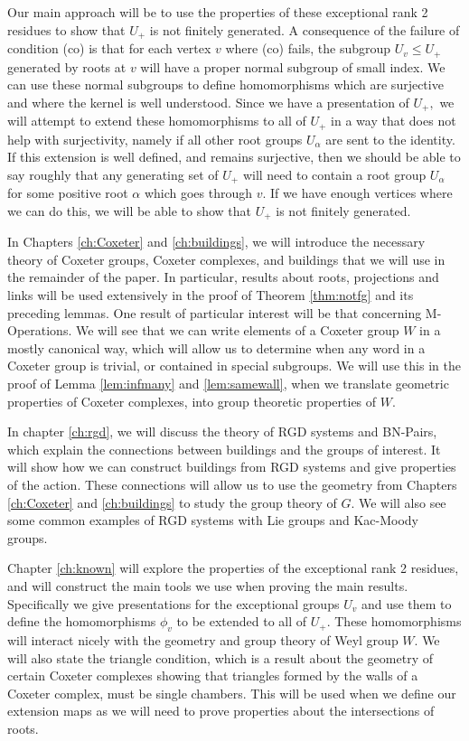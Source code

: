 \documentclass[class=book, crop=false,12 pt]{standalone}
\begin{document}
Our main approach will be to use the properties of these exceptional rank 2 residues to show that $U_+$ is not finitely generated. A consequence of the failure of condition (co) is that for each vertex $v$ where (co) fails, the subgroup $U_v\le U_+$ generated by roots at $v$ will have a proper normal subgroup of small index. We can use these normal subgroups to define homomorphisms which are surjective and where the kernel is well understood. Since we have a presentation of $U_+,$ we will attempt to extend these homomorphisms to all of $U_+$ in a way that does not help with surjectivity, namely if all other root groups $U_\alpha$ are sent to the identity. If this extension is well defined, and remains surjective, then we should be able to say roughly that any generating set of $U_+$ will need to contain a root group $U_\alpha$ for some positive root $\alpha$ which goes through $v.$ If we have enough vertices where we can do this, we will be able to show that $U_+$ is not finitely generated.

In Chapters \ref{ch:Coxeter} and \ref{ch:buildings}, we will introduce the necessary theory of Coxeter groups, Coxeter complexes, and buildings that we will use in the remainder of the paper. In particular, results about roots, projections and links will be used extensively in the proof of Theorem \ref{thm:notfg} and its preceding lemmas. One result of particular interest will be that concerning M-Operations. We will see that we can write elements of a Coxeter group $W$ in a mostly canonical way, which will allow us to determine when any word in a Coxeter group is trivial, or contained in special subgroups. We will use this in the proof of Lemma \ref{lem:infmany} and \ref{lem:samewall}, when we translate geometric properties of Coxeter complexes, into group theoretic properties of $W.$

In chapter \ref{ch:rgd}, we will discuss the theory of RGD systems and BN-Pairs, which explain the connections between buildings and the groups of interest. It will show how we can construct buildings from RGD systems and give properties of the action. These connections will allow us to use the geometry from Chapters \ref{ch:Coxeter} and \ref{ch:buildings} to study the group theory of $G.$ We will also see some common examples of RGD systems with Lie groups and Kac-Moody groups.

Chapter \ref{ch:known} will explore the properties of the exceptional rank 2 residues, and will construct the main tools we use when proving the main results. Specifically we give presentations for the exceptional groups $U_v$ and use them to define the homomorphisms $\phi_v$ to be extended to all of $U_+.$ These homomorphisms will interact nicely with the geometry and group theory of Weyl group $W.$ We will also state the triangle condition, which is a result about the geometry of certain Coxeter complexes showing that triangles formed by the walls of a Coxeter complex, must be single chambers. This will be used when we define our extension maps as we will need to prove properties about the intersections of roots.
\end{document}
